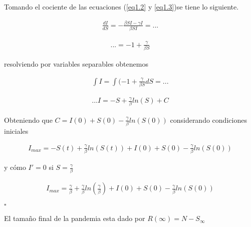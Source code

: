 \begin{Dem}

Tomando el cociente de las ecuaciones (\ref{eq1.2} y \ref{eq1.3})se tiene lo siguiente.

\begin{align*}
\frac{dI}{dS} = - \frac{\beta SI - \gamma I}{\beta SI} = ...
\end{align*}

\begin{align*}
... = -1 + \frac{\gamma}{\beta S}
\end{align*}

resolviendo por variables separables obtenemos

\begin{align*}
\int I = \int (-1 + \frac{\gamma}{\beta S} dS = ...
\end{align*}

\begin{align*}
... I = - S + \frac{\gamma}{\beta} ln(S) + C
\end{align*}

Obteniendo que  $C = I(0) + S(0)  - \frac{\gamma}{\beta} ln(S(0))$ considerando condiciones iniciales 

\begin{align*}
I_{max} = - S(t) + \frac{\gamma}{\beta} ln(S(t)) + I(0) + S(0) - \frac{\gamma}{\beta} ln(S(0))
\end{align*}

y cómo $I' = 0$  si  $S = \frac{\gamma}{\beta}$ 

\begin{align*}
I_{max} = \frac{\gamma}{\beta} + \frac{\gamma}{\beta} ln(\frac{\gamma}{\beta}) + I(0) + S(0) - \frac{\gamma}{\beta} ln(S(0))
\end{align*}


\end{Dem}

\hfill	$\square$

\begin{Af}
El tamaño final de la pandemia esta dado por $R(\infty) = N - S_{\infty}$
\end{Af}

